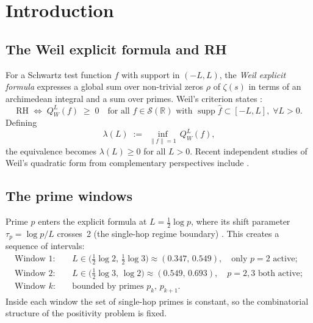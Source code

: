 \documentclass[12pt,a4paper]{amsart}
\theoremstyle{plain}
\theoremstyle{definition}
\newcommand{\R}{\mathbb{R}}
\begin{document}
\maketitle

\tableofcontents

\section{Introduction}
\label{sec:intro}

\subsection{The Weil explicit formula and RH}

For a Schwartz test function $f$ with support in $(-L,L)$, the \emph{Weil
explicit formula} expresses a global sum over non-trivial zeros $\rho$ of
$\zeta(s)$ in terms of an archimedean integral and a sum over primes.
Weil's criterion states \cite{Weil1952,Bombieri2000}:
\[
  \text{RH} \;\Longleftrightarrow\;
  Q_W^L(f) \;\ge\; 0 \quad
  \text{for all } f \in \mathcal{S}(\R) \text{ with }
  \operatorname{supp}\hat f \subset [-L,L],\;
  \forall L > 0.
\]
Defining
\[
  \lambda(L) \;:=\; \inf_{\|f\|=1}\, Q_W^L(f),
\]
the equivalence becomes $\lambda(L) \ge 0$ for all $L > 0$.
Recent independent studies of Weil's quadratic form from complementary
perspectives include \cite{Suzuki2026,Kim2026,Groskin2026}.

\subsection{The prime windows}

Prime $p$ enters the explicit formula at $L = \tfrac12\log p$, where its shift
parameter $\tau_p = \log p / L$ crosses~2 (the single-hop regime boundary)
\cite{Tao2026WFP}.  This creates a sequence of intervals:
\begin{align*}
  \text{Window 1:}&\quad L \in \bigl(\tfrac12\log 2,\, \tfrac12\log 3\bigr)
    \approx (0.347,\, 0.549), \quad \text{only } p=2 \text{ active};\\
  \text{Window 2:}&\quad L \in \bigl(\tfrac12\log 3,\, \log 2\bigr)
    \approx (0.549,\, 0.693), \quad p=2,3 \text{ both active};\\
  \text{Window } k{:}& \quad \text{bounded by primes } p_k,\, p_{k+1}.
\end{align*}
Inside each window the set of single-hop primes is constant, so the
combinatorial structure of the positivity problem is fixed.
\end{document}
